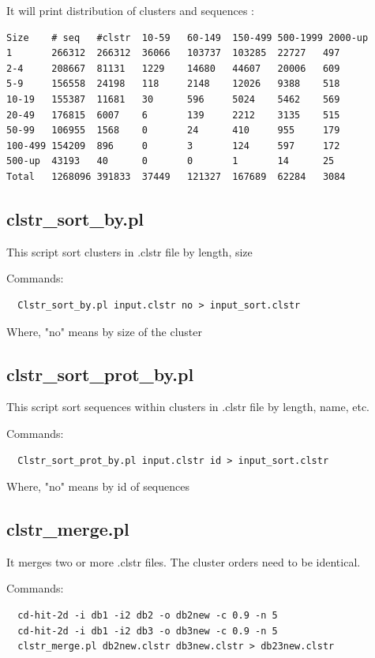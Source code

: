 \documentclass[12pt,a4paper]{article}
\begin{document}
It will print distribution of clusters and sequences :

\begin{lstlisting}
Size    # seq   #clstr  10-59   60-149  150-499 500-1999 2000-up
1       266312  266312  36066   103737  103285  22727   497
2-4     208667  81131   1229    14680   44607   20006   609
5-9     156558  24198   118     2148    12026   9388    518
10-19   155387  11681   30      596     5024    5462    569
20-49   176815  6007    6       139     2212    3135    515
50-99   106955  1568    0       24      410     955     179
100-499 154209  896     0       3       124     597     172
500-up  43193   40      0       0       1       14      25
Total   1268096 391833  37449   121327  167689  62284   3084
\end{lstlisting}

\subsection{clstr\_sort\_by.pl }

This script sort clusters in .clstr file by length, size

Commands:

\begin{lstlisting}
  Clstr_sort_by.pl input.clstr no > input_sort.clstr
\end{lstlisting}
Where, "no" means by size of the cluster

\subsection{clstr\_sort\_prot\_by.pl }

This script sort sequences within clusters in .clstr file by length, name, etc.

Commands:

\begin{lstlisting}
  Clstr_sort_prot_by.pl input.clstr id > input_sort.clstr
\end{lstlisting}
Where, "no" means by id of sequences

\subsection{clstr\_merge.pl }

It merges two or more .clstr files. The cluster orders need to be identical.

Commands:

\begin{lstlisting}
  cd-hit-2d -i db1 -i2 db2 -o db2new -c 0.9 -n 5
  cd-hit-2d -i db1 -i2 db3 -o db3new -c 0.9 -n 5
  clstr_merge.pl db2new.clstr db3new.clstr > db23new.clstr
\end{lstlisting}
\end{document}
